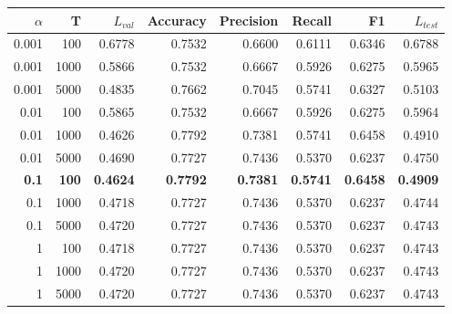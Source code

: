 \begin{tabular}{rrrrrrrr}
\toprule
$\alpha$ & T & $L_{val}$ & Accuracy & Precision & Recall & F1 & $L_{test}$ \\
\midrule
0.001 & 100 & 0.6778 & 0.7532 & 0.6600 & 0.6111 & 0.6346 & 0.6788 \\
0.001 & 1000 & 0.5866 & 0.7532 & 0.6667 & 0.5926 & 0.6275 & 0.5965 \\
0.001 & 5000 & 0.4835 & 0.7662 & 0.7045 & 0.5741 & 0.6327 & 0.5103 \\
0.01 & 100 & 0.5865 & 0.7532 & 0.6667 & 0.5926 & 0.6275 & 0.5964 \\
0.01 & 1000 & 0.4626 & 0.7792 & 0.7381 & 0.5741 & 0.6458 & 0.4910 \\
0.01 & 5000 & 0.4690 & 0.7727 & 0.7436 & 0.5370 & 0.6237 & 0.4750 \\
\textbf{0.1} & \textbf{100} & \textbf{0.4624} & \textbf{0.7792} & \textbf{0.7381} & \textbf{0.5741} & \textbf{0.6458} & \textbf{0.4909} \\
0.1 & 1000 & 0.4718 & 0.7727 & 0.7436 & 0.5370 & 0.6237 & 0.4744 \\
0.1 & 5000 & 0.4720 & 0.7727 & 0.7436 & 0.5370 & 0.6237 & 0.4743 \\
1 & 100 & 0.4718 & 0.7727 & 0.7436 & 0.5370 & 0.6237 & 0.4743 \\
1 & 1000 & 0.4720 & 0.7727 & 0.7436 & 0.5370 & 0.6237 & 0.4743 \\
1 & 5000 & 0.4720 & 0.7727 & 0.7436 & 0.5370 & 0.6237 & 0.4743 \\
\bottomrule
\end{tabular}
